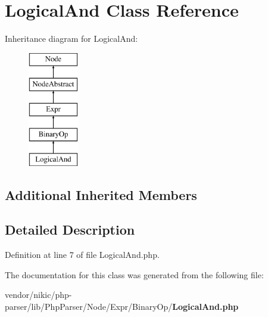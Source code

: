 \section{Logical\+And Class Reference}
\label{class_php_parser_1_1_node_1_1_expr_1_1_binary_op_1_1_logical_and}
Inheritance diagram for Logical\+And\+:\begin{figure}[H]
\begin{center}
\leavevmode
\includegraphics[height=5.000000cm]{class_php_parser_1_1_node_1_1_expr_1_1_binary_op_1_1_logical_and}
\end{center}
\end{figure}
\subsection*{Additional Inherited Members}


\subsection{Detailed Description}


Definition at line 7 of file Logical\+And.\+php.



The documentation for this class was generated from the following file\+:\begin{DoxyCompactItemize}
\item 
vendor/nikic/php-\/parser/lib/\+Php\+Parser/\+Node/\+Expr/\+Binary\+Op/{\bf Logical\+And.\+php}\end{DoxyCompactItemize}
